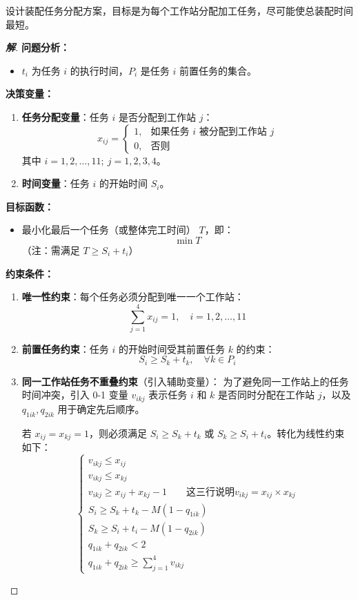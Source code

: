 \documentclass[a4paper,12pt]{ctexart} %
\newenvironment{solution}{\begin{proof}[\textbf{解}]}{\end{proof}}
\begin{document}
	\noindent 设计装配任务分配方案，目标是为每个工作站分配加工任务，尽可能使总装配时间最短。
	
	\begin{solution}
		\textbf{问题分析：}
		\begin{itemize}
			\item $t_i$ 为任务 $i$ 的执行时间，$P_i$ 是任务 $i$ 前置任务的集合。
		\end{itemize}
		
		\textbf{决策变量：}
		\begin{enumerate}
			\item \textbf{任务分配变量}：任务 $i$ 是否分配到工作站 $j$：
			\[
			x_{ij} = \begin{cases}
				1, & \text{如果任务 } i \text{ 被分配到工作站 } j \\
				0, & \text{否则}
			\end{cases}
			\]
			其中 $i = 1, 2, \dots, 11;\ j = 1, 2, 3, 4$。
			
			\item \textbf{时间变量}：任务 $i$ 的开始时间 $S_i$。
		\end{enumerate}
		
		\textbf{目标函数：}
		\begin{itemize}
			\item 最小化最后一个任务（或整体完工时间） $T$，即：
			\[
			\min T
			\]
			（注：需满足 $T \ge S_i + t_i$）
		\end{itemize}
		
		\textbf{约束条件：}
		\begin{enumerate}
			\item \textbf{唯一性约束}：每个任务必须分配到唯一一个工作站：
			\[
			\sum_{j=1}^{4} x_{ij} = 1, \quad i = 1, 2, \dots, 11
			\]
			
			\item \textbf{前置任务约束}：任务 $i$ 的开始时间受其前置任务 $k$ 的约束：
			\[
			S_i \ge S_k + t_k, \quad \forall k \in P_i
			\]
			
			\item \textbf{同一工作站任务不重叠约束}（引入辅助变量）：
			为了避免同一工作站上的任务时间冲突，引入 0-1 变量 $v_{ikj}$ 表示任务 $i$ 和 $k$ 是否同时分配在工作站 $j$，以及 $q_{1ik}, q_{2ik}$ 用于确定先后顺序。
			
			若 $x_{ij}=x_{kj}=1$，则必须满足 $S_i \ge S_k + t_k$ 或 $S_k \ge S_i + t_i$。转化为线性约束如下：
			\[
			\begin{cases}
				v_{ikj} \le x_{ij} \\
				v_{ikj} \le x_{kj} \\
				v_{ikj} \ge x_{ij} + x_{kj} - 1 \qquad \text{这三行说明} v_{ikj}=x_{ij}\times x_{kj}\\
				S_i \ge S_k + t_k - M(1 - q_{1ik}) \\
				S_k \ge S_i + t_i - M(1 - q_{2ik}) \\
				q_{1ik} + q_{2ik} < 2 \\
				q_{1ik} + q_{2ik} \ge \sum_{j=1}^{4} v_{ikj}
			\end{cases}
			\]
		\end{enumerate}
		

\end{solution}
\end{document}

